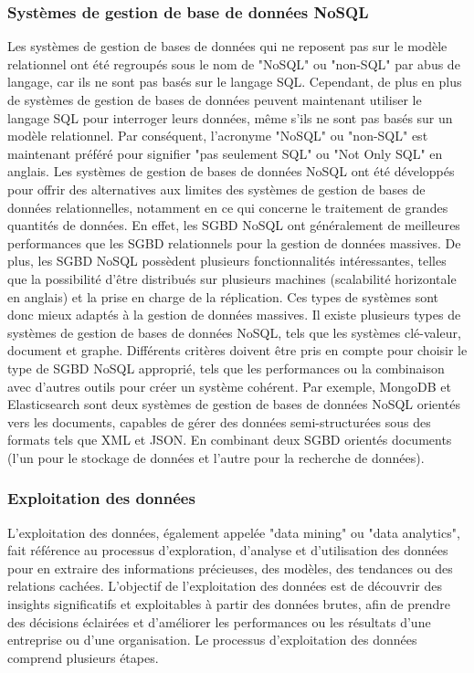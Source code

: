 \documentclass{article}
\begin{document}
	\subsubsection{Systèmes de gestion de base de données NoSQL}
	Les systèmes de gestion de bases de données qui ne reposent pas sur le modèle relationnel ont été regroupés sous le nom de "NoSQL" ou "non-SQL" par abus de langage, car ils ne sont pas basés sur le langage SQL. Cependant, de plus en plus de systèmes de gestion de bases de données peuvent maintenant utiliser le langage SQL pour interroger leurs données, même s’ils ne sont pas basés sur un modèle relationnel. Par conséquent, l’acronyme "NoSQL" ou "non-SQL" est maintenant préféré pour signifier "pas seulement SQL" ou "Not Only SQL" en anglais. Les systèmes de gestion de bases de données NoSQL ont été développés pour offrir des alternatives aux limites des systèmes de gestion de bases de données relationnelles, notamment en ce qui concerne le traitement de grandes quantités de données. En effet, les SGBD NoSQL ont généralement de meilleures performances que les SGBD relationnels pour la gestion de données massives. De plus, les SGBD NoSQL possèdent plusieurs fonctionnalités intéressantes, telles que la possibilité d’être distribués sur plusieurs machines (scalabilité horizontale en anglais) et la prise en charge de la réplication. Ces types de systèmes sont donc mieux adaptés à la gestion de données massives. Il existe plusieurs types de systèmes de gestion de bases de données NoSQL, tels que les systèmes clé-valeur, document et graphe. Différents critères doivent être pris en compte pour choisir le type de SGBD NoSQL approprié, tels que les performances ou la combinaison avec d’autres outils pour créer un système cohérent. Par exemple, MongoDB et Elasticsearch sont deux systèmes de gestion de bases de données NoSQL orientés vers les documents, capables de gérer des données semi-structurées sous des formats tels que XML et JSON. En combinant deux SGBD orientés documents (l’un pour le stockage de données et l’autre pour la recherche de données).
	
	\subsubsection{Exploitation des données}
	L’exploitation des données, également appelée "data mining" ou "data analytics", fait référence au processus d’exploration, d’analyse et d’utilisation des données pour en extraire des informations précieuses, des modèles, des tendances ou des relations cachées. L’objectif de l’exploitation des données est de découvrir des insights significatifs et exploitables à partir des données brutes, afin de prendre des décisions éclairées et d’améliorer les performances ou les résultats d’une entreprise ou d’une organisation. Le processus d’exploitation des données comprend plusieurs étapes.
	
\end{document}
